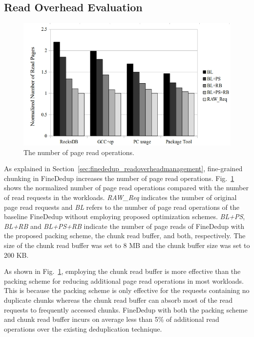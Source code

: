 \subsection{Read Overhead Evaluation}
\label{sec:finededup_readoverheadevaluation}

\begin{figure}[t]
	\center
	\includegraphics[scale=0.4]{figure/finededup/increasedPageRead_}
	\caption{The number of page read operations.} %
	\label{fig:pageread}
\end{figure}

As explained in Section~\ref{sec:finededup_readoverheadmanagement}, 
fine-grained chunking in FineDedup increases the number of page read operations. 
Fig.~\ref{fig:pageread} shows the normalized number of page read operations compared with the number of read requests
in the workloads.
\textit{RAW\_Req} indicates the number of original page read requests and \textit{BL} refers to the number of page
read operations of the baseline FineDedup without employing proposed optimization schemes. 
\textit{BL+PS}, \textit{BL+RB} and \textit{BL+PS+RB} indicate the number of page reads of FineDedup with the proposed
packing scheme, the chunk read buffer, and both, respectively. 
The size of the chunk read buffer was set to 8 MB and the chunk buffer size was set to 200 KB.

As shown in Fig.~\ref{fig:pageread}, employing the chunk read buffer is more effective than the packing scheme 
for reducing additional page read operations in most workloads. This is because the packing scheme is only
effective for the requests containing no duplicate chunks whereas the chunk read buffer can absorb most of the read requests 
to frequently accessed chunks.
FineDedup with both the packing scheme and chunk read buffer incurs on average less than 5\% of additional read operations
over the existing deduplication technique.

